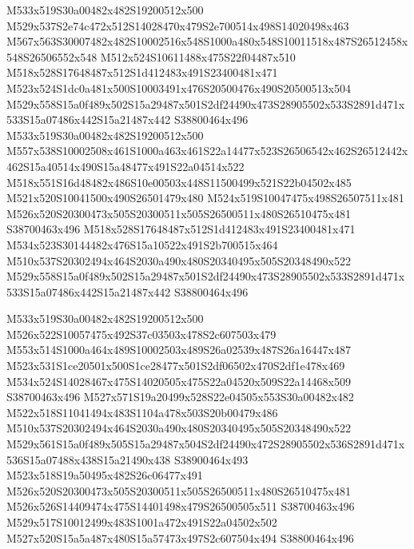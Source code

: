 \documentclass{article}
\begin{document}
\begin{multicols}{2}
M533x519S30a00482x482S19200512x500 M529x537S2e74c472x512S14028470x479S2e700514x498S14020498x463 M567x563S30007482x482S10002516x548S1000a480x548S10011518x487S26512458x548S26506552x548 M512x524S10611488x475S22f04487x510 M518x528S17648487x512S1d412483x491S23400481x471 M523x524S1dc0a481x500S10003491x476S20500476x490S20500513x504 M529x558S15a0f489x502S15a29487x501S2df24490x473S28905502x533S2891d471x533S15a07486x442S15a21487x442 S38800464x496 M533x519S30a00482x482S19200512x500 M557x538S10002508x461S1000a463x461S22a14477x523S26506542x462S26512442x462S15a40514x490S15a48477x491S22a04514x522 M518x551S16d48482x486S10e00503x448S11500499x521S22b04502x485 M521x520S10041500x490S26501479x480 M524x519S10047475x498S26507511x481 M526x520S20300473x505S20300511x505S26500511x480S26510475x481 S38700463x496 M518x528S17648487x512S1d412483x491S23400481x471 M534x523S30144482x476S15a10522x491S2b700515x464 M510x537S20302494x464S2030a490x480S20340495x505S20348490x522 M529x558S15a0f489x502S15a29487x501S2df24490x473S28905502x533S2891d471x533S15a07486x442S15a21487x442 S38800464x496

M533x519S30a00482x482S19200512x500 M526x522S10057475x492S37c03503x478S2c607503x479 M553x514S1000a464x489S10002503x489S26a02539x487S26a16447x487 M523x531S1ce20501x500S1ce28477x501S2df06502x470S2df1e478x469 M534x524S14028467x475S14020505x475S22a04520x509S22a14468x509 S38700463x496 M527x571S19a20499x528S22e04505x553S30a00482x482 M522x518S11041494x483S1104a478x503S20b00479x486 M510x537S20302494x464S2030a490x480S20340495x505S20348490x522 M529x561S15a0f489x505S15a29487x504S2df24490x472S28905502x536S2891d471x536S15a07488x438S15a21490x438 S38900464x493 M523x518S19a50495x482S26c06477x491 M526x520S20300473x505S20300511x505S26500511x480S26510475x481 M526x526S14409474x475S14401498x479S26500505x511 S38700463x496 M529x517S10012499x483S1001a472x491S22a04502x502 M527x520S15a5a487x480S15a57473x497S2c607504x494 S38800464x496


\end{multicols}
\end{document}
